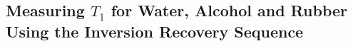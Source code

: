 \subsection{Measuring \texorpdfstring{$T_1$}{T1} for Water, Alcohol and Rubber Using the Inversion Recovery Sequence} \label{B4}

